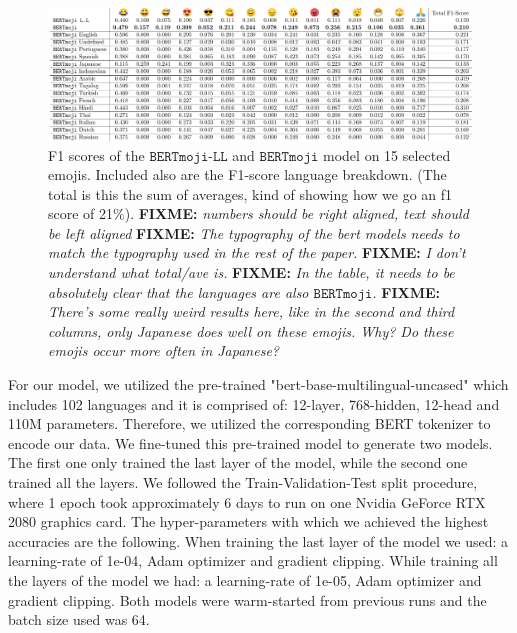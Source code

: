 \documentclass[11pt]{article}
\newcommand{\fixme}[1]{{\color{red} \textbf{FIXME:} {\textit {#1}}}}
\newcommand{\bertmoji}{\texttt{BERTmoji}}
\newcommand{\bertmojill}{\texttt{BERTmoji-LL}}
\begin{document}
\begin{figure}
    \centering
    \includegraphics[width=\textwidth]{images/f1_score_table_fix.pdf}
    \caption{
        F1 scores of the $\bertmojill$ and $\bertmoji$ model on 15 selected emojis. Included also are the F1-score language breakdown. (The total is this the sum of averages, kind of showing how we go an f1 score of 21\%).
        \fixme{numbers should be right aligned, text should be left aligned}
        \fixme{The typography of the bert models needs to match the typography used in the rest of the paper.}
        \fixme{I don't understand what total/ave is.}
        \fixme{In the table, it needs to be absolutely clear that the languages are also $\bertmoji$.}
        \fixme{There's some really weird results here, like in the second and third columns, only Japanese does well on these emojis.  Why?  Do these emojis  occur more often in Japanese?}
    }
    \label{fig:tweets_per_day}
\end{figure}

For our model, we utilized the pre-trained "bert-base-multilingual-uncased" which includes 102 languages and it is comprised of: 12-layer, 768-hidden, 12-head and 110M parameters.
Therefore, we utilized the corresponding BERT tokenizer to encode our data.
We fine-tuned this pre-trained model to generate two models. 
The first one only trained the last layer of the model, while the second one trained all the layers.
We followed the Train-Validation-Test split procedure, where 1 epoch took approximately 6 days to run on one Nvidia GeForce RTX 2080 graphics card.
The hyper-parameters with which we achieved the highest accuracies are the following. 
When training the last layer of the model we used: a learning-rate of 1e-04, Adam optimizer and gradient clipping. 
While training all the layers of the model we had: a learning-rate of 1e-05, Adam optimizer and gradient clipping. 
Both models were warm-started from previous runs and the batch size used was 64.
\end{document}
